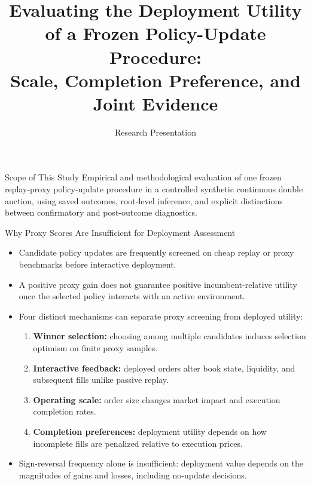 \documentclass[10pt,aspectratio=169]{beamer}
\title[Deployment Utility of a Frozen Policy-Update Procedure]{Evaluating the Deployment Utility of a Frozen Policy-Update Procedure:\\Scale, Completion Preference, and Joint Evidence}
\subtitle{Research Presentation}
\author{}
\date{}
\begin{document}
\begin{frame}
  \titlepage
  \vspace{-1.0em}
  \begin{block}{Scope of This Study}
    \footnotesize
    Empirical and methodological evaluation of one frozen replay-proxy policy-update procedure in a controlled synthetic continuous double auction, using saved outcomes, root-level inference, and explicit distinctions between confirmatory and post-outcome diagnostics.
  \end{block}
\end{frame}

\begin{frame}{Why Proxy Scores Are Insufficient for Deployment Assessment}
  \begin{itemize}
    \item Candidate policy updates are frequently screened on cheap replay or proxy benchmarks before interactive deployment.
    \item A positive proxy gain does not guarantee positive incumbent-relative utility once the selected policy interacts with an active environment.
    \item Four distinct mechanisms can separate proxy screening from deployed utility:
      \begin{enumerate}
        \item \textbf{Winner selection:} choosing among multiple candidates induces selection optimism on finite proxy samples.
        \item \textbf{Interactive feedback:} deployed orders alter book state, liquidity, and subsequent fills unlike passive replay.
        \item \textbf{Operating scale:} order size changes market impact and execution completion rates.
        \item \textbf{Completion preferences:} deployment utility depends on how incomplete fills are penalized relative to execution prices.
      \end{enumerate}
    \item Sign-reversal frequency alone is insufficient: deployment value depends on the magnitudes of gains and losses, including no-update decisions.
  \end{itemize}
\end{frame}
\end{document}
